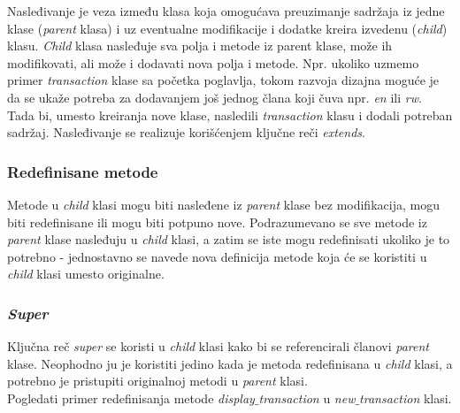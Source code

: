 Nasleđivanje je veza između klasa koja omogućava preuzimanje sadržaja iz jedne
klase (\emph{parent} klasa) i uz eventualne modifikacije i dodatke kreira
izvedenu (\emph{child}) klasu. \emph{Child} klasa nasleđuje sva polja i metode
iz parent klase, može ih modifikovati, ali može i dodavati nova polja i metode.
Npr. ukoliko uzmemo primer \emph{transaction} klase sa početka poglavlja, tokom
razvoja dizajna moguće je da se ukaže potreba za dodavanjem još jednog člana
koji čuva npr. \emph{en} ili \emph{rw}. Tada bi, umesto kreiranja nove klase,
nasledili \emph{transaction} klasu i dodali potreban sadržaj. Nasleđivanje se
realizuje korišćenjem ključne reči \emph{extends}.




\subsubsection{Redefinisane metode}

Metode u \emph{child} klasi mogu biti nasleđene iz \emph{parent} klase bez
modifikacija, mogu biti redefinisane ili mogu biti potpuno nove. Podrazumevano
se sve metode iz \emph{parent} klase nasleđuju u \emph{child} klasi, a zatim se
iste mogu redefinisati ukoliko je to potrebno - jednostavno se navede nova
definicija metode koja će se koristiti u \emph{child} klasi umesto originalne.


\subsubsection{\emph{Super}}

Ključna reč \emph{super} se koristi u \emph{child} klasi kako bi se
referencirali članovi \emph{parent} klase. Neophodno ju je koristiti jedino kada
je metoda redefinisana u \emph{child} klasi, a potrebno je pristupiti
originalnoj metodi u \emph{parent} klasi.\\

Pogledati primer redefinisanja metode \emph{display\(\_\)transaction} u
\emph{new\(\_\)transaction} klasi.


